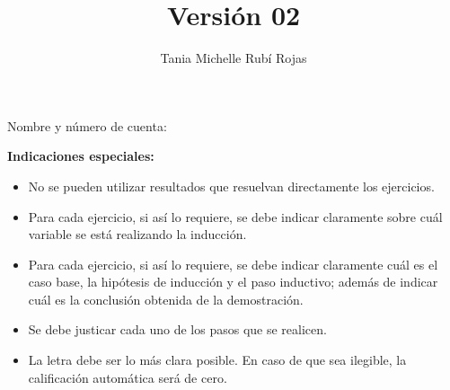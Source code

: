 \documentclass[oneside]{style}
\title{Versión 02}
\author{Tania Michelle Rubí Rojas}
\begin{document}
\maketitle

\vspace{2.5mm}
\noindent
Nombre y número de cuenta: \hrulefill\

\vspace{5mm}
\noindent
\textbf{Indicaciones especiales:}
{\small
\begin{multicols}{2}
\begin{itemize}
  \item No se pueden utilizar resultados que resuelvan directamente los 
  ejercicios. 

  \item Para cada ejercicio, si así lo requiere, se debe indicar claramente
  sobre cuál variable se está realizando la inducción. 

  \item Para cada ejercicio, si así lo requiere, se debe indicar claramente 
  cuál es el caso base, la hipótesis de inducción y el paso inductivo; 
  además de indicar cuál es la conclusión obtenida de la demostración. 

  \item Se debe justicar cada uno de los pasos que se realicen. 

  \item La letra debe ser lo más clara posible. En caso de que sea ilegible, 
  la calificación automática será de cero. 
\end{itemize}
\end{multicols}
}
\end{document}
